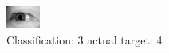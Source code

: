 \begin{figure}[h!]
\begin{center}
\includegraphics[width=0.60\columnwidth]{figures/ID3172_class_3_target_4.png}
\end{center}
\caption{ Classification: 3 actual target: 4}
\label{fig:ID3172_class_3_target_4}
\end{figure}
